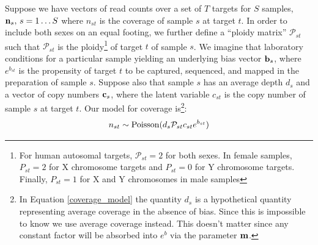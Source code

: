 \documentclass[nofootinbib,amssymb,amsmath]{revtex4}
\newcommand{\vb}{{\bf b}}
\newcommand{\vc}{{\bf c}}
\newcommand{\vn}{{\bf n}}
\newcommand{\vm}{{\bf m}}
\newcommand{\PP}{\mathcal{P}}
\begin{document}
Suppose we have vectors of read counts over a set of $T$ targets for $S$ samples, $\vn_s, \, s = 1 \ldots S$ where $n_{st}$ is the coverage of sample $s$ at target $t$. In order to include both sexes on an equal footing, we further define a ``ploidy matrix'' $\PP_{st}$ such that $\PP_{st}$ is the ploidy\footnote{For human autosomal targets, $\PP_{st} = 2$ for both sexes. In female samples, $P_{st} = 2$ for X chromosome targets and $P_{st} = 0$ for Y chromosome targets. Finally, $P_{st} = 1$ for X and Y chromosomes in male samples} of target $t$ of sample $s$. We imagine that laboratory conditions for a particular sample yielding an underlying bias vector $\vb_s$, where $e^{b_{st}}$ is the propensity of target $t$ to be captured, sequenced, and mapped in the preparation of sample $s$.  Suppose also that sample $s$ has an average depth $d_s$ and a vector of copy numbers $\vc_s$, where the latent variable $c_{st}$ is the copy number of sample $s$ at target $t$.  Our model for coverage is\footnote{In Equation \ref{coverage_model} the quantity $d_s$ is a hypothetical quantity representing average coverage in the absence of bias.  Since this is impossible to know we use average coverage instead.  This doesn't matter since any constant factor will be absorbed into $e^b$ via the parameter $\vm$.}:
%
\begin{equation}
n_{st} \sim {\rm Poisson}(d_s \PP_{st} c_{st} e^{b_{st}})
\label{coverage_model}
\end{equation}
\end{document}

